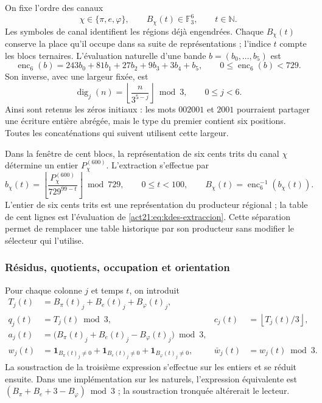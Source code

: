 On fixe l'ordre des canaux
\[
 \chi\in\{\pi,e,\varphi\},
 \qquad B_\chi(t)\in\mathbb F_3^6,
 \qquad t\in\mathbb N.
\]
Les symboles de canal identifient les régions déjà engendrées. Chaque
$B_\chi(t)$ conserve la place qu'il occupe dans sa suite de représentations ;
l'indice $t$ compte les blocs ternaires. L'évaluation naturelle d'une
bande $b=(b_0,\ldots,b_5)$ est
\begin{equation}
 \operatorname{enc}_6(b)=
 243b_0+81b_1+27b_2+9b_3+3b_4+b_5,
 \qquad 0\leq\operatorname{enc}_6(b)<729.
 \label{act21:eq:kdes-enc6}
\end{equation}
Son inverse, avec une largeur fixée, est
\[
 \operatorname{dig}_j(n)=
 \left\lfloor\frac{n}{3^{5-j}}\right\rfloor\bmod3,
 \qquad 0\leq j<6.
\]
Ainsi sont retenus les zéros initiaux : les mots $002001$ et $2001$
pourraient partager une écriture entière abrégée, mais le type du
premier contient six positions. Toutes les concaténations qui suivent
utilisent cette largeur.

Dans la fenêtre de cent blocs, la représentation de six cents trits du
canal $\chi$ détermine un entier $P_\chi^{(600)}$. L'extraction s'effectue
par
\begin{equation}
 b_\chi(t)=
 \left\lfloor\frac{P_\chi^{(600)}}{729^{99-t}}\right\rfloor\bmod729,
 \qquad 0\leq t<100,
 \qquad B_\chi(t)=\operatorname{enc}_6^{-1}(b_\chi(t)).
 \label{act21:eq:kdes-extraccion}
\end{equation}
L'entier de six cents trits est une représentation du producteur régional ;
la table de cent lignes est l'évaluation de
\eqref{act21:eq:kdes-extraccion}. Cette séparation permet de remplacer une table
historique par son producteur sans modifier le sélecteur qui l'utilise.

\subsubsection{Résidus, quotients, occupation et orientation}

Pour chaque colonne $j$ et temps $t$, on introduit
\begin{align}
 T_j(t)&=B_\pi(t)_j+B_e(t)_j+B_\varphi(t)_j,\\
 q_j(t)&=T_j(t)\bmod3,
 &c_j(t)&=\left\lfloor T_j(t)/3\right\rfloor,\\
 a_j(t)&=\bigl(B_\pi(t)_j+B_e(t)_j-B_\varphi(t)_j\bigr)\bmod3,\\
 w_j(t)&=\mathbf1_{B_\pi(t)_j\ne0}
       +\mathbf1_{B_e(t)_j\ne0}
       +\mathbf1_{B_\varphi(t)_j\ne0},
 &\bar w_j(t)&=w_j(t)\bmod3.
 \label{act21:eq:kdes-firmas}
\end{align}
La soustraction de la troisième expression s'effectue sur les entiers et se réduit
ensuite. Dans une implémentation sur les naturels, l'expression équivalente
est $(B_\pi+B_e+3-B_\varphi)\bmod3$ ; la soustraction tronquée altérerait le lecteur.

